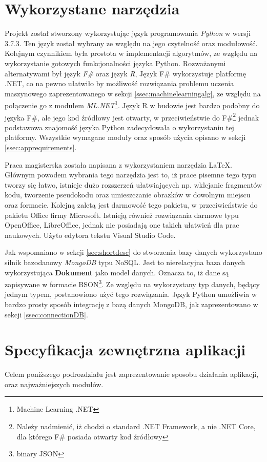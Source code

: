 \section{Wykorzystane narzędzia}
\label{sec:tools}
Projekt został stworzony wykorzystując język programowania \emph{Python} \cite{Python} w wersji 3.7.3. Ten język został wybrany ze względu na jego czytelność oraz modułowość. Kolejnym czynnikiem była prostota w implementacji algorytmów, ze względu na wykorzystanie gotowych funkcjonalności języka Python. Rozważanymi alternatywami był język \emph{F\#} oraz język \emph{R}, Język F\# wykorzystuje platformę .NET, co na pewno ułatwiło by możliwość rozwiązania problemu uczenia maszynowego zaprezentowanego w sekcji \ref{ssec:machinelearningalg}, ze względu na połączenie go z modułem \emph{ML.NET}\footnote{Machine Learning .NET}. Język R w budowie jest bardzo podobny do języka F\#, ale jego kod źródłowy jest otwarty, w przeciwieństwie do F\#\footnote{Należy nadmienić, iż chodzi o standard .NET Framework, a nie .NET Core, dla którego F\# posiada otwarty kod źródłowy} jednak podstawowa znajomość języka Python zadecydowała o wykorzystaniu tej platformy. Wszystkie wymagane moduły oraz sposób użycia opisano w sekcji \ref{ssec:apprequirements}.\par
Praca magisterska została napisana z wykorzystaniem narzędzia \LaTeX\cite{Latex}. Głównym powodem wybrania tego narzędzia jest to, iż prace pisemne tego typu tworzy się łatwo, istnieje dużo rozszerzeń ułatwiających np. wklejanie fragmentów kodu, tworzenie pseudokodu oraz umieszczanie obrazków w dowolnym miejscu oraz formacie. Kolejną zaletą jest darmowość tego pakietu, w przeciwieństwie do pakietu Office firmy Microsoft. Istnieją również rozwiązania darmowe typu OpenOffice, LibreOffice, jednak nie posiadają one takich ułatwień dla prac naukowych. Użyto edytora tekstu Visual Studio Code.\par
Jak wspomniano w sekcji \ref{sec:shortdesc} do stworzenia bazy danych wykorzystano silnik bazodanowy \emph{MongoDB} typu NoSQL. Jest to nierelacyjna baza danych wykorzystująca \textbf{Dokument} jako model danych. Oznacza to, iż dane są zapisywane w formacie BSON\footnote{binary JSON}. Ze względu na wykorzystany typ danych, będący jednym typem, postanowiono użyć tego rozwiązania. Język Python umożliwia w bardzo prosty sposób integrację z bazą danych MongoDB, jak zaprezentowano w sekcji \ref{ssec:connectionDB}.
\section{Specyfikacja zewnętrzna aplikacji}
Celem poniższego podrozdziału jest zaprezentowanie sposobu działania aplikacji, oraz najważniejszych modułów.
